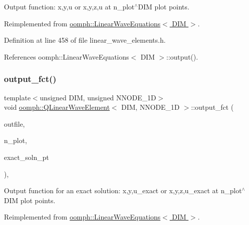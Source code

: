 Output function\+: x,y,u or x,y,z,u at n\+\_\+plot$^\wedge$\+D\+IM plot points. 



Reimplemented from \hyperlink{classoomph_1_1LinearWaveEquations_a2e3dd0d7c46d095fea74969c3648f0ca}{oomph\+::\+Linear\+Wave\+Equations$<$ D\+I\+M $>$}.



Definition at line 458 of file linear\+\_\+wave\+\_\+elements.\+h.



References oomph\+::\+Linear\+Wave\+Equations$<$ D\+I\+M $>$\+::output().

\mbox{\label{classoomph_1_1QLinearWaveElement_af72b64dee3c8690aca4734d7f41515bc}} 
\subsubsection{\texorpdfstring{output\+\_\+fct()}{output\_fct()}\hspace{0.1cm}{\footnotesize\ttfamily [1/2]}}
{\footnotesize\ttfamily template$<$unsigned D\+IM, unsigned N\+N\+O\+D\+E\+\_\+1D$>$ \\
void \hyperlink{classoomph_1_1QLinearWaveElement}{oomph\+::\+Q\+Linear\+Wave\+Element}$<$ D\+IM, N\+N\+O\+D\+E\+\_\+1D $>$\+::output\+\_\+fct (\begin{DoxyParamCaption}\item[{std\+::ostream \&}]{outfile,  }\item[{const unsigned \&}]{n\+\_\+plot,  }\item[{\hyperlink{classoomph_1_1FiniteElement_a690fd33af26cc3e84f39bba6d5a85202}{Finite\+Element\+::\+Steady\+Exact\+Solution\+Fct\+Pt}}]{exact\+\_\+soln\+\_\+pt }\end{DoxyParamCaption})\hspace{0.3cm}{\ttfamily [inline]}, {\ttfamily [virtual]}}



Output function for an exact solution\+: x,y,u\+\_\+exact or x,y,z,u\+\_\+exact at n\+\_\+plot$^\wedge$\+D\+IM plot points. 



Reimplemented from \hyperlink{classoomph_1_1LinearWaveEquations_a3ae24c98f2d190e56fe24e754de682d8}{oomph\+::\+Linear\+Wave\+Equations$<$ D\+I\+M $>$}.



